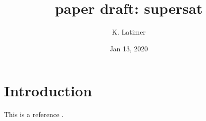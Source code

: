 \documentclass{article}
\title{paper draft: supersat}
\author{K. Latimer}
\date{Jan 13, 2020}
\begin{document}
\maketitle


\section{Introduction}
This is a reference \cite{Fan2018}.



\end{document}
